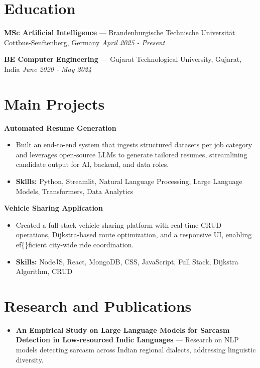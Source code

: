 \documentclass[a4paper,10pt]{article}
\begin{document}
\section*{Education}
\textbf{MSc Artificial Intelligence} — Brandenburgische Technische Universität Cottbus-Senftenberg, Germany \hfill \textit{April 2025 - Present}\par
\vspace{1.5pt}
\textbf{BE Computer Engineering} — Gujarat Technological University, Gujarat, India \hfill \textit{June 2020 - May 2024}\par

\section*{Main Projects}
\textbf{Automated Resume Generation}\par
\vspace{1pt}
\begin{itemize}
  \item Built an end-to-end system that ingests structured datasets per job category and leverages open-source LLMs to generate tailored resumes, streamlining candidate output for AI, backend, and data roles.
  \item \textbf{Skills:} Python, Streamlit, Natural Language Processing, Large Language Models, Transformers, Data Analytics
\end{itemize}
\vspace{3pt}
\textbf{Vehicle Sharing Application}\par
\vspace{1pt}
\begin{itemize}
  \item Created a full-stack vehicle-sharing platform with real-time CRUD operations, Dijkstra-based route optimization, and a responsive UI, enabling ef\{\}ficient city-wide ride coordination.
  \item \textbf{Skills:} NodeJS, React, MongoDB, CSS, JavaScript, Full Stack, Dijkstra Algorithm, CRUD
\end{itemize}

\section*{Research and Publications}
\begin{itemize}
\item \textbf{An Empirical Study on Large Language Models for Sarcasm Detection in Low-resourced Indic Languages} — Research on NLP models detecting sarcasm across Indian regional dialects, addressing linguistic diversity.
\end{itemize}
\end{document}
